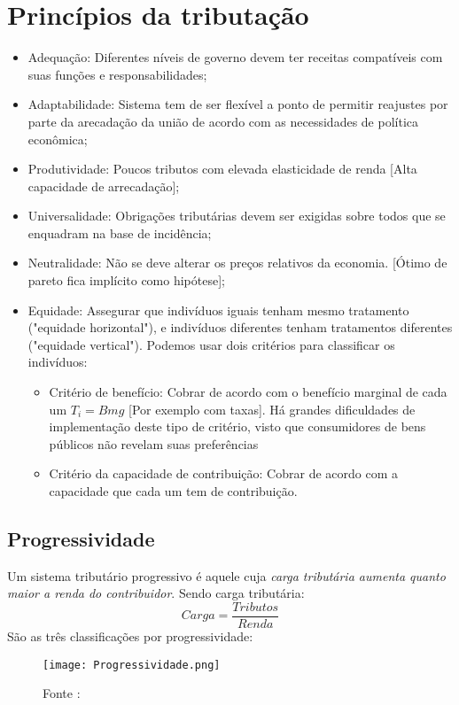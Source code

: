 \documentclass[12pt,a4paper,oneside,brazil]{abntex2}
\begin{document}
\section{Princípios da tributação}
\begin{itemize}
\item Adequação: Diferentes níveis de governo devem ter receitas compatíveis com suas funções e responsabilidades; 
\item Adaptabilidade: Sistema tem de ser flexível a ponto de permitir reajustes por parte da arecadação da união de acordo com as necessidades de política econômica;
\item Produtividade: Poucos tributos com elevada elasticidade de renda [Alta capacidade de arrecadação];
\item Universalidade: Obrigações tributárias devem ser exigidas sobre todos que se enquadram na base de incidência;
\item Neutralidade: Não se deve alterar os preços relativos da economia. [Ótimo de pareto fica implícito como hipótese];
\item Equidade: Assegurar que indivíduos iguais tenham mesmo tratamento ("equidade horizontal"), e indivíduos diferentes tenham tratamentos diferentes ("equidade vertical"). Podemos usar dois critérios para classificar os indivíduos:
\begin{itemize}
\item Critério de benefício: Cobrar de acordo com o benefício marginal de cada um $ T_i = Bmg$ [Por exemplo com taxas]. Há grandes dificuldades de implementação deste tipo de critério, visto que consumidores de bens públicos não revelam suas preferências 
\item Critério da capacidade de contribuição: Cobrar de acordo com a capacidade que cada um tem de contribuição.
\end{itemize}
\end{itemize}

\subsection{Progressividade}
Um sistema tributário progressivo é aquele cuja \emph{carga tributária aumenta quanto maior a renda do contribuidor}. Sendo carga tributária:
\begin{equation} \label{Carga Tributária}
Carga = \frac{Tributos}{Renda}
\end{equation}
São as três classificações por progressividade:

\begin{figure}[h]
\centering
\texttt{[image: Progressividade.png]}
\caption{Fonte : \cite[p. 165]{rezende}}
\end{figure}
\end{document}
